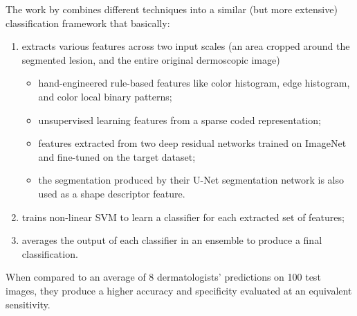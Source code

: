 The work by \citeauthor{hybrid1} \cite{hybrid1} combines different techniques into a similar (but more extensive) classification framework that basically:

\begin{enumerate}
    \item extracts various features across two input scales (an area cropped around the segmented lesion, and the entire original dermoscopic image)
    \begin{itemize}
        \item hand-engineered rule-based features like color histogram, edge histogram, and color local binary patterns;
        \item unsupervised learning features from a sparse coded representation;
        \item features extracted from two deep residual networks trained on ImageNet and fine-tuned on the target dataset;
        \item the segmentation produced by their U-Net segmentation network is also used as a shape descriptor feature.
    \end{itemize}
    \item trains non-linear \ac{SVM} to learn a classifier for each extracted set of features;
    \item averages the output of each classifier in an ensemble to produce a final classification.
\end{enumerate}

When compared to an average of 8 dermatologists' predictions on 100 test images, they produce a higher accuracy and specificity evaluated at an equivalent sensitivity.

